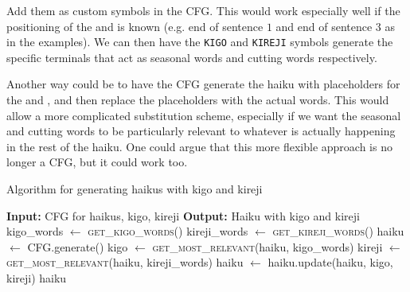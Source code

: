 \begin{enumarabic}
  \item Add them as custom symbols in the CFG.
    This would work especially well if the positioning
    of the  and  is known (e.g. end of sentence $1$
    and end of sentence $3$ as in the examples).
    We can then have the \verb|KIGO| and \verb|KIREJI| symbols
    generate the specific terminals that act as seasonal words
    and cutting words respectively.

  \item Another way could be to have the CFG generate the haiku
    with placeholders for the  and ,
    and then replace the placeholders with the actual words.
    This would allow a more complicated substitution scheme,
    especially if we want the seasonal and cutting words to be
    particularly relevant to whatever is actually happening in
    the rest of the haiku.
    One could argue that this more flexible approach is no longer
    a CFG, but it could work too.
  
  \begin{small}
    \begin{answer}
      \centering
        \begin{algorithm}[H]
          \caption{Algorithm for generating haikus with kigo and kireji}
          \begin{algorithmic}[1]
            \State \textbf{Input:} CFG for haikus, kigo, kireji
            \State \textbf{Output:} Haiku with kigo and kireji
            \State
            \State kigo\_words $\gets$ \textsc{get\_kigo\_words}() 
            \State kireji\_words $\gets$ \textsc{get\_kireji\_words}() 
            \State {}
            \State haiku $\gets$ CFG.generate()
            \State kigo $\gets$ \textsc{get\_most\_relevant}(haiku, kigo\_words)
            \State kireji $\gets$ \textsc{get\_most\_relevant}(haiku, kireji\_words)
            \State haiku $\gets$ haiku.update(haiku, kigo, kireji)
            \State \Return haiku
            \EndFunction
          \end{algorithmic}
        \end{algorithm}
    \end{answer}
  \end{small}
\end{enumarabic}


